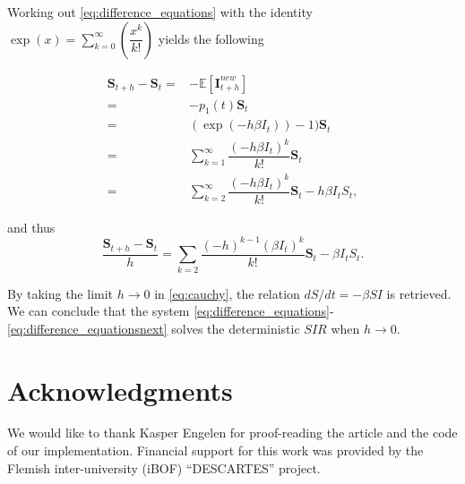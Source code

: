 \documentclass[a4paper,preprint]{elsarticle}
\renewcommand{\vec}[1]{\boldsymbol{#1}}
\begin{document}
Working out \eqref{eq:difference_equations} with the identity $\exp(x)=\sum_{k=0}^{\infty}\left(\dfrac{x^k}{k!}\right)$ yields the following

\begin{equation*}
    \begin{split}
    \vec{S}_{t+h}-\vec{S}_{t} = {} & -\mathbb{E}[\vec{I}_{t+h}^{new}]\\
    ={}&-p_1(t)\vec{S}_{t}\\
    ={}&(\exp(-h\beta I_t))-1)\vec{S}_{t}\\
    ={}&\sum_{k=1}^{\infty}\dfrac{(-h\beta I_t)^k}{k!}\vec{S}_{t}\\
    ={}&\sum_{k=2}^{\infty}\dfrac{(-h\beta I_t)^k}{k!}\vec{S}_{t}-h\beta I_t S_t,
    \end{split}\end{equation*}

and thus
\begin{equation}
\label{eq:cauchy}
\dfrac{\vec{S}_{t+h}-\vec{S}_{t}}{h}=\sum_{k=2}\dfrac{(-h)^{k-1}(\beta I_t)^{k}}{k!}\vec{S}_{t}-\beta I_t S_t.
\end{equation}

By taking the limit $h\rightarrow{0}$ in \eqref{eq:cauchy}, the relation $dS/dt =  -\beta SI$ is retrieved. We can conclude that the system \eqref{eq:difference_equations}-\eqref{eq:difference_equationsnext} solves the deterministic $SIR$ when $h\rightarrow{0}$. 

\section*{Acknowledgments}
We would like to thank Kasper Engelen for proof-reading the article and the code of our implementation.
Financial support for this work was provided by the Flemish inter-university (iBOF) ``DESCARTES'' project.





\end{document}
